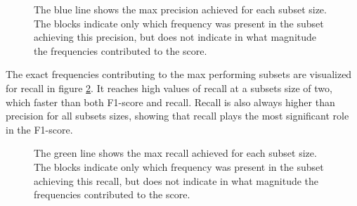         \begin{figure}[H]
            \centering
            
            \caption[Best frequency combination - Precision]{The blue line shows the max precision achieved for each subset size. The blocks indicate only which frequency was present in the subset achieving this precision, but does not indicate in what magnitude the frequencies contributed to the score.}
          	\medskip 
            \label{increasing_freq_precision_score_fig}
        \end{figure}
        
    The exact frequencies contributing to the max performing subsets are visualized for recall in figure \ref{increasing_freq_recall_score_fig}. It reaches high values of recall at a subsets size of two, which faster than both F1-score and recall. Recall is also always higher than precision for all subsets sizes, showing that recall plays the most significant role in the F1-score.
    
    
        \begin{figure}[H]
            \centering
            
            \caption[Best frequency combination - Recall]{The green line shows the max recall achieved for each subset size. The blocks indicate only which frequency was present in the subset achieving this recall, but does not indicate in what magnitude the frequencies contributed to the score.}
          	\medskip 
            \label{increasing_freq_recall_score_fig}
        \end{figure}

